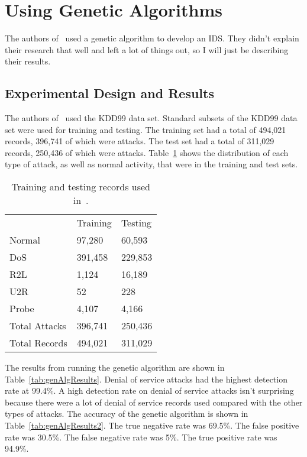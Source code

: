 \documentclass{sig-alternate}
\begin{document}
\section{Using Genetic Algorithms}
\label{sec:genAlgImp}

The authors of~\cite{DBLP:journals/corr/abs-1204-1336} used a genetic algorithm to develop an IDS. They didn't explain their research that well and left a lot of things out, so I will just be describing their results.




\subsection{Experimental Design and Results}
The authors of~\cite{DBLP:journals/corr/abs-1204-1336} used the KDD99 data set. Standard subsets of the KDD99 data set were used for training and testing. The training set had a total of 494,021 records, 396,741 of which were attacks. The test set had a total of 311,029 records, 250,436 of which were attacks. Table~\ref{tab:numberOfRecords} shows the distribution of each type of attack, as well as normal activity, that were in the training and test sets.

\begin{table}
\center
\caption{Training and testing records used in~\cite{DBLP:journals/corr/abs-1204-1336}.}
\vspace{0.20cm}
\begin{tabular}{lll}
  & Training & Testing \\ 
Normal & 97,280 & 60,593\\ \hline
DoS	   & 391,458 & 229,853\\
R2L    & 1,124   & 16,189\\
U2R    & 52      & 228\\
Probe  & 4,107  & 4,166\\ \hline
Total Attacks & 396,741 & 250,436 \\
Total Records  & 494,021 & 311,029\\
\end{tabular}
\center
\label{tab:numberOfRecords}
\end{table}



The results from running the genetic algorithm are shown in Table~\ref{tab:genAlgResults}. Denial of service attacks had the highest detection rate at 99.4\%. A high detection rate on denial of service attacks isn't surprising because there were a lot of denial of service records used compared with the other types of attacks. The accuracy of the genetic algorithm is shown in Table~\ref{tab:genAlgResults2}. The true negative rate was 69.5\%. The false positive rate was 30.5\%. The false negative rate was 5\%. The true positive rate was 94.9\%.
\end{document}
